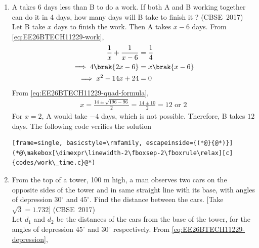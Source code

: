 \begin{enumerate}[label=\thesubsection.\arabic*, ref=\thesubsection.\theenumi]
\solution
Multiplying by $\brak{2x+1}\brak{x-1}$,
\begin{align}
	\brak{x-1}^2 + \brak{2x+1}^2 &= 2\brak{2x+1}\brak{x-1}
	\\
	\implies 5x^2 + 2x + 2 &= 4x^2 - 2x - 2
	\\
	\implies x^2 + 4x + 4 &= 0
	\\
	\implies \brak{x+2}^2 &= 0
\end{align}
Here $q^2 - 4pr = 16 - 16 = 0$, so from \eqref{eq:EE26BTECH11229-quad-equal} the roots are equal,
\begin{align}
	x = -2
\end{align}
which satisfies $x \neq -\frac{1}{2}, 1$.
\item 
A takes 6 days less than B to do a work. If both A and B working together can do it in 4 days, how many days will B take to finish it ?
\hfill (CBSE~2017)
\\
\solution
Let B take $x$ days to finish the work. Then A takes $x - 6$ days. From \eqref{eq:EE26BTECH11229-work},
\begin{align}
	\frac{1}{x} + \frac{1}{x-6} &= \frac{1}{4}
	\\
	\implies 4\brak{2x - 6} &= x\brak{x-6}
	\\
	\implies x^2 - 14x + 24 &= 0
\end{align}
From \eqref{eq:EE26BTECH11229-quad-formula},
\begin{align}
	x = \frac{14 \pm \sqrt{196 - 96}}{2} = \frac{14 \pm 10}{2} = 12 \text{ or } 2
\end{align}
For $x = 2$, A would take $-4$ days, which is not possible. Therefore, B takes $12$ days.
The following code verifies the solution
\begin{lstlisting}[frame=single, basicstyle=\rmfamily, escapeinside={(*@}{@*)}]
(*@\makebox[\dimexpr\linewidth-2\fboxsep-2\fboxrule\relax][c]{codes/work\_time.c}@*)
\end{lstlisting}
\item 
From the top of a tower, 100 m high, a man observes two cars on the opposite sides of the tower and in same straight line with its base, with angles of depression $30^{\circ}$ and $45^{\circ}$. Find the distance between the cars. \hfill [Take $\sqrt{3} = 1.732$]
\hfill (CBSE~2017)
\\
\solution
Let $d_1$ and $d_2$ be the distances of the cars from the base of the tower, for the angles of depression $45^{\circ}$ and $30^{\circ}$ respectively. From \eqref{eq:EE26BTECH11229-depression},
\begin{align}

\end{align}
\end{enumerate}
